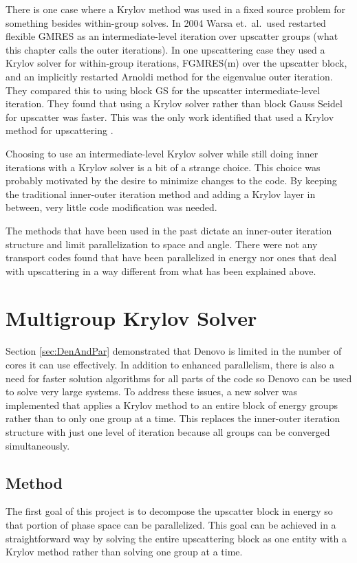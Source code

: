 There is one case where a Krylov method was used in a fixed source problem for something besides within-group solves. In 2004 Warsa et.\ al.\ used restarted flexible GMRES as an intermediate-level iteration over upscatter groups (what this chapter calls the outer iterations). In one upscattering case they used a Krylov solver for within-group iterations, FGMRES(m) over the upscatter block, and an implicitly restarted Arnoldi method for the eigenvalue outer iteration. They compared this to using block GS for the upscatter intermediate-level iteration. They found that using a Krylov solver rather than block Gauss Seidel for upscatter was faster. This was the only work identified that used a Krylov method for upscattering \cite{Warsa2004a}. 

Choosing to use an intermediate-level Krylov solver while still doing inner iterations with a Krylov solver is a bit of a strange choice. This choice was probably motivated by the desire to minimize changes to the code. By keeping the traditional inner-outer iteration method and adding a Krylov layer in between, very little code modification was needed. 

The methods that have been used in the past dictate an inner-outer iteration structure and limit parallelization to space and angle. There were not any transport codes found that have been parallelized in energy nor ones that deal with upscattering in a way different from what has been explained above. 

\section{Multigroup Krylov Solver}
Section \ref{sec:DenAndPar} demonstrated that Denovo is limited in the number of cores it can use effectively. In addition to enhanced parallelism, there is also a need for faster solution algorithms for all parts of the code so Denovo can be used to solve very large systems. To address these issues, a new solver was implemented that applies a Krylov method to an entire block of energy groups rather than to only one group at a time. This replaces the inner-outer iteration structure with just one level of iteration because all groups can be converged simultaneously. 

\subsection{Method}
The first goal of this project is to decompose the upscatter block in energy so that portion of phase space can be parallelized. This goal can be achieved in a straightforward way by solving the entire upscattering block as one entity with a Krylov method rather than solving one group at a time. 

